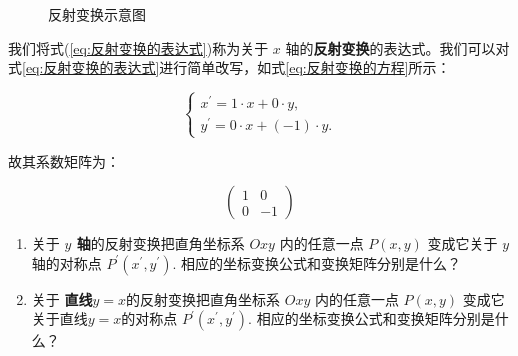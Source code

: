 \begin{figure}[h]
\centering
{}
\caption{反射变换示意图\label{fig:反射变换}}
\end{figure}

我们将式(\ref{eq:反射变换的表达式})称为关于 $x$ 轴的\textcolor{third}{\bf 反射变换}的表达式。我们可以对式\ref{eq:反射变换的表达式}进行简单改写，如式\ref{eq:反射变换的方程}所示：

\begin{equation}
\left\{\begin{array}{l}
x^{\prime}=1 \cdot x + 0\cdot y, \\
y^{\prime}= 0\cdot x + (-1) \cdot y .
\end{array}\right.
\label{eq:反射变换的方程}
\end{equation}

故其系数矩阵为：

\begin{equation}
\left(\begin{array}{rr}
1  & 0 \\
0  & -1
\end{array}\right)
\label{eq:反射变换示例矩阵}
\end{equation}


\vspace{0.5cm}

\begin{exercise}
\begin{enumerate}
    \item 关于 \textbf{$y$ 轴}的反射变换把直角坐标系 $O x y$ 内的任意一点 $P(x, y)$ 变成它关于 $y$ 轴的对称点 $P^{\prime}\left(x^{\prime}, y^{\prime}\right)$. 相应的坐标变换公式和变换矩阵分别是什么？
    \item 关于 \textbf{直线$y=x$}的反射变换把直角坐标系 $O x y$ 内的任意一点 $P(x, y)$ 变成它关于直线$y=x$的对称点 $P^{\prime}\left(x^{\prime}, y^{\prime}\right)$. 相应的坐标变换公式和变换矩阵分别是什么？
\end{enumerate}
\end{exercise}

